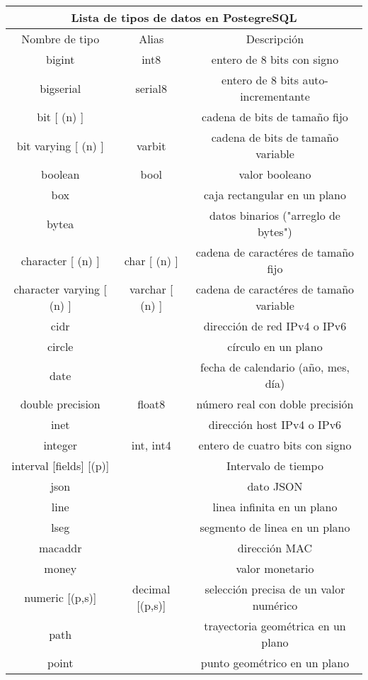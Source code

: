 \documentclass[11pt]{article}
\begin{document}
\begin{center}
\begin{tabular}{ |c|c|c|  }
 \hline
 \multicolumn{3}{|c|}{Lista de tipos de datos en PostegreSQL} \\
 \hline
Nombre de tipo & Alias & Descripción\\
\hline
bigint & int8 & entero de 8 bits con signo\\
\hline
bigserial & serial8 & entero de 8 bits auto-incrementante\\
\hline
bit [ (n) ] &  & cadena de bits de tamaño fijo\\
\hline
bit varying [ (n) ] & varbit &  cadena de bits de tamaño variable\\
\hline
boolean & bool & valor booleano\\
\hline
box & & caja rectangular en un plano\\
\hline
bytea & & datos binarios ("arreglo de bytes")\\
\hline
character [ (n) ] & char [ (n) ]& cadena de caractéres de tamaño fijo\\
\hline
character varying [ (n) ] & varchar [ (n) ] & cadena de caractéres de tamaño variable \\
\hline
cidr & & dirección de red IPv4 o IPv6\\
\hline
circle & & círculo en un plano\\
\hline
date & & fecha de calendario (año, mes, día)\\
\hline
double precision & float8 & número real con doble precisión\\
\hline
inet & & dirección host IPv4 o IPv6\\
\hline
integer & int, int4 & entero de cuatro bits con signo\\
\hline
interval [fields] [(p)] && Intervalo de tiempo\\
\hline
json && dato JSON\\
\hline
line && linea infinita en un plano\\
\hline
lseg && segmento de linea en un plano\\
\hline
macaddr && dirección MAC\\
\hline
money && valor monetario\\
\hline
numeric [(p,s)] & decimal [(p,s)] & selección precisa de un valor numérico\\
\hline
path && trayectoria geométrica en un plano\\
\hline
point && punto geométrico en un plano\\
\hline

\end{tabular}
\end{center}
\end{document}

